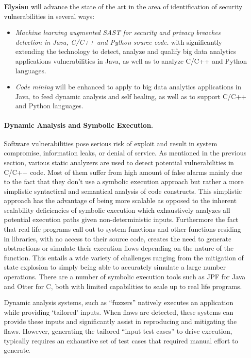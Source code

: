 \documentclass[a4paper,11pt]{article}
\newcommand{\project}[1]{\textbf{#1}\xspace}
\newcommand{\SECURITY}{\project{Elysian}}
\newcommand{\TheProject}{\SECURITY}
\begin{document}
\begin{mdframed}[backgroundcolor=gray!10]
\TheProject{} will advance the state of the art in the area of identification of security vulnerabilities in several ways:
\begin{itemize}
\item \emph{Machine learning augmented SAST for security and privacy breaches detection in Java, C/C++ and Python source code.} with significantly extending the technology to detect, analyze and qualify big data analytics applications vulnerabilities in Java, as well as to analyze C/C++ and Python languages.

\item \emph{Code mining} will be enhanced to apply to big data analytics applications in Java, to feed dynamic analysis and self healing, as well as to support C/C++ and Python languages.
\end{itemize}
\end{mdframed}


\paragraph{Dynamic Analysis and Symbolic Execution.}
Software vulnerabilities pose serious risk of exploit and result in system compromise, information leaks, or denial of service. As mentioned in the previous section, various static analyzers are used to detect potential vulnerabilities in C/C++ code. Most of them suffer from high amount of false alarms mainly due to the fact that they don’t use a symbolic execution approach but rather a more simplistic syntactical and semantical analysis of code constructs. This simplistic approach has the advantage of being more scalable as opposed to the inherent scalability deficiencies of symbolic execution which exhaustively analyzes all potential execution paths given non-deterministic inputs. Furthermore the fact that real life programs call out to system functions and other functions residing in libraries, with no access to their source code, creates the need to generate abstractions or simulate their execution flows depending on the nature of the function. This entails a wide variety of challenges ranging from the mitigation of state explosion to simply being able to accurately simulate a large number operations. There are a number of symbolic execution tools such as JPF for Java and Otter for C, both with limited capabilities to scale up to real life programs.

Dynamic analysis systems, such as “fuzzers” natively executes an application while providing ‘tailored’ inputs. When flaws are detected, these systems can provide these inputs and significantly assist in reproducing and mitigating the flaws. However, generating the tailored “input test cases” to drive execution, typically requires an exhaustive set of test cases that required manual effort to generate. 
\end{document}

